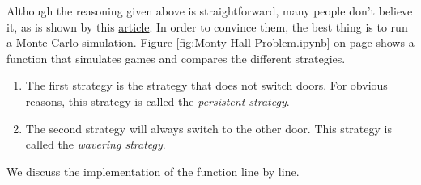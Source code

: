 Although the reasoning given above is straightforward, many people don't believe it, as is shown
by this \href{https://priceonomics.com/the-time-everyone-corrected-the-worlds-smartest/}{article}.  In order to
convince them, the best thing is to run a Monte Carlo simulation.  Figure \ref{fig:Monty-Hall-Problem.ipynb}
on page 
\pageref{fig:Monty-Hall-Problem.ipynb} shows a function that simulates  games and compares the
different strategies.  
\begin{enumerate}
\item The first strategy is the strategy that does not switch doors.
      For obvious reasons, this strategy is called the \emph{persistent strategy}.
\item The second strategy will always switch to the other door.
      This strategy is called the \emph{wavering strategy}.
\end{enumerate}
We discuss the implementation of the function  line by line.
